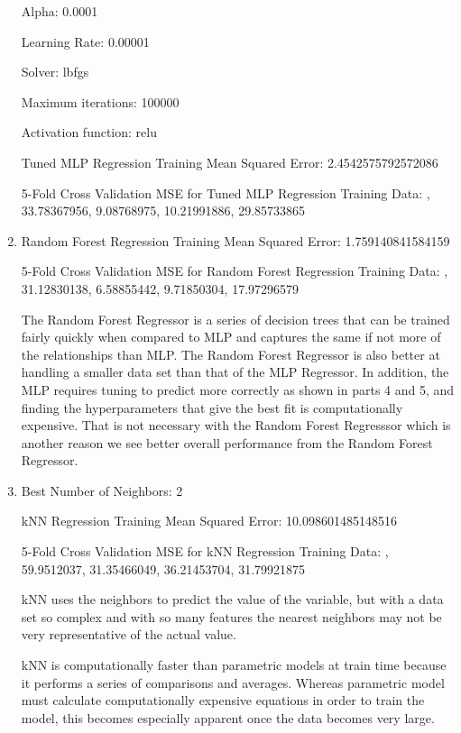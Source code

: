 \documentclass[submit]{harvardml}
\begin{document}
\begin{enumerate}
    Alpha: 0.0001
    
    Learning Rate: 0.00001
    
    Solver: lbfgs
    
    Maximum iterations: 100000
    
    Activation function: relu
    
    Tuned MLP Regression Training Mean Squared Error: 2.4542575792572086
    
    5-Fold Cross Validation MSE for Tuned MLP Regression Training Data: , 33.78367956,  9.08768975, 10.21991886, 29.85733865


    \item
    Random Forest Regression Training Mean Squared Error: 1.759140841584159

    5-Fold Cross Validation MSE for Random Forest Regression Training Data: , 31.12830138,  6.58855442, 9.71850304, 17.97296579
    
    The Random Forest Regressor is a series of decision trees that can be trained fairly quickly when compared to MLP and captures the same if not more of the relationships than MLP. The Random Forest Regressor is also better at handling a smaller data set than that of the MLP Regressor. In addition, the MLP requires tuning to predict more correctly as shown in parts 4 and 5, and finding the hyperparameters that give the best fit is computationally expensive. That is not necessary with the Random Forest Regresssor which is another reason we see better overall performance from the Random Forest Regressor.
    
    \item
    Best Number of Neighbors: 2
    
    kNN Regression Training Mean Squared Error: 10.098601485148516
    
    5-Fold Cross Validation MSE for kNN Regression Training Data: , 59.9512037,  31.35466049, 36.21453704, 31.79921875
    
    kNN uses the neighbors to predict the value of the variable, but with a data set so complex and with so many features the nearest neighbors may not be very representative of the actual value.
    
    kNN is computationally faster than parametric models at train time because it performs a series of comparisons and averages. Whereas parametric model must calculate computationally expensive equations in order to train the model, this becomes especially apparent once the data becomes very large. 
    

\end{enumerate}
\end{document}
